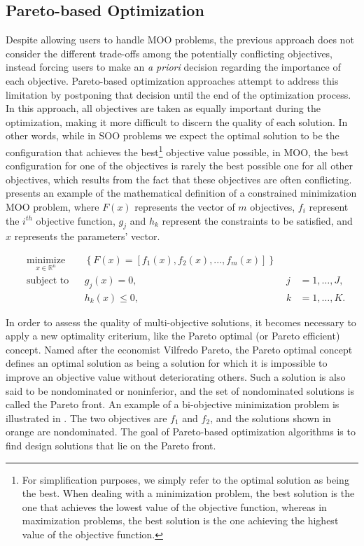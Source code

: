 	\subsection{Pareto-based Optimization}
	\label{ssec:pareto}
	
	Despite allowing users to handle \ac{MOO} problems, the previous approach does not consider the different trade-offs among the potentially conflicting objectives, instead forcing users to make an \textit{a priori} decision regarding the importance of each objective. Pareto-based optimization approaches attempt to address this limitation by postponing that decision until the end of the optimization process. In this approach, all objectives are taken as equally important during the optimization, making it more difficult to discern the quality of each solution. In other words, while in \ac{SOO} problems we expect the optimal solution to be the configuration that achieves the best\footnote{For simplification purposes, we simply refer to the optimal solution as being the best. When dealing with a minimization problem, the best solution is the one that achieves the lowest value of the objective function, whereas in maximization problems, the best solution is the one achieving the highest value of the objective function.} objective value possible, in \ac{MOO}, the best configuration for one of the objectives is rarely the best possible one for all other objectives, which results from the fact that these objectives are often conflicting.  presents an example of the mathematical definition of a constrained minimization \ac{MOO} problem, where $F(x)$ represents the vector of $m$ objectives, $f_i$ represent the $i^{th}$ objective function, $g_j$ and $h_k$ represent the constraints to be satisfied, and $x$ represents the parameters' vector.
	
	\begin{equation} \label{eq:pareto-based}
	\begin{aligned}
	& \underset{x \in \mathbb{R}^n}{\text{minimize}}
	& & \left\lbrace F(x) = \left[f_1(x), f_2(x), ..., f_m(x)\right]  \right\rbrace \\
	& \text{subject to}
	& & g_j(x) = 0, & \; j &= 1, \ldots, J, \\ 
	&&& h_k(x) \leq 0, & \; k &= 1, \ldots, K.
	\end{aligned}
	\end{equation}
	
	In order to assess the quality of multi-objective solutions, it becomes necessary to apply a new optimality criterium, like the Pareto optimal (or Pareto efficient) concept. Named after the economist Vilfredo Pareto, the Pareto optimal concept defines an optimal solution as being a solution for which it is impossible to improve an objective value without deteriorating others. Such a solution is also said to be nondominated or noninferior, and the set of nondominated solutions is called the Pareto front. An example of a bi-objective minimization problem is illustrated in . The two objectives are $f_1$ and $f_2$, and the solutions shown in orange are nondominated. The goal of Pareto-based optimization algorithms is to find design solutions that lie on the Pareto front.
	
